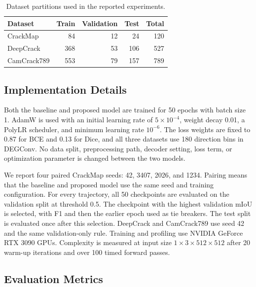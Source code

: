 \documentclass[preprint,12pt]{elsarticle}
\begin{document}
\begin{table}[H]
\centering
\caption{Dataset partitions used in the reported experiments.}
\label{tab:datasets}
\begin{tabular}{lrrrr}
\toprule
Dataset & Train & Validation & Test & Total \\
\midrule
CrackMap & 84 & 12 & 24 & 120 \\
DeepCrack & 368 & 53 & 106 & 527 \\
CamCrack789 & 553 & 79 & 157 & 789 \\
\bottomrule
\end{tabular}
\end{table}

\subsection{Implementation Details}

Both the baseline and proposed model are trained for 50 epochs with batch size 1. AdamW is used with an initial learning rate of $5\times10^{-4}$, weight decay 0.01, a PolyLR scheduler, and minimum learning rate $10^{-6}$. The loss weights are fixed to 0.87 for BCE and 0.13 for Dice, and all three datasets use 180 direction bins in DEGConv. No data split, preprocessing path, decoder setting, loss term, or optimization parameter is changed between the two models.

We report four paired CrackMap seeds: 42, 3407, 2026, and 1234. Pairing means that the baseline and proposed model use the same seed and training configuration. For every trajectory, all 50 checkpoints are evaluated on the validation split at threshold 0.5. The checkpoint with the highest validation mIoU is selected, with F1 and then the earlier epoch used as tie breakers. The test split is evaluated once after this selection. DeepCrack and CamCrack789 use seed 42 and the same validation-only rule. Training and profiling use NVIDIA GeForce RTX 3090 GPUs. Complexity is measured at input size $1\times3\times512\times512$ after 20 warm-up iterations and over 100 timed forward passes.

\subsection{Evaluation Metrics}
\end{document}
